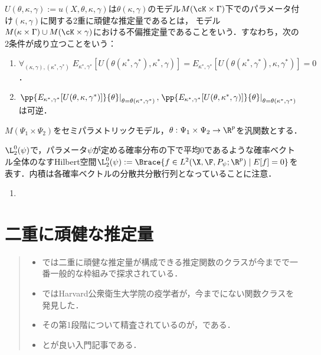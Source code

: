 \documentclass[uplatex,dvipdfmx]{jsreport}
\begin{document}
\begin{definition}
    $U(\theta,\kappa,\gamma):=u(X,\theta,\kappa,\gamma)$は$\theta(\kappa,\gamma)$のモデル$M(\cK\times\Gamma)$下でのパラメータ付け$(\kappa,\gamma)$に関する2重に頑健な推定量であるとは，
    モデル$M(\kappa\times\Gamma)\cup M(\cK\times\gamma)$における不偏推定量であることをいう．すなわち，次の2条件が成り立つことをいう：
    \begin{enumerate}
        \item $\forall_{(\kappa,\gamma),(\kappa^*,\gamma^*)}\;E_{\kappa^*,\gamma^*}[U(\theta(\kappa^*,\gamma^*),\kappa^*,\gamma)]=E_{\kappa^*,\gamma^*}[U(\theta(\kappa^*,\gamma^*),\kappa,\gamma^*)]=0$．
        \item $\left.\pp{E_{\kappa^*,\gamma^*}[U(\theta,\kappa,\gamma^*)]}{\theta}\right|_{\theta=\theta(\kappa^*,\gamma^*)},\left.\pp{E_{\kappa^*,\gamma^*}[U(\theta,\kappa^*,\gamma)]}{\theta}\right|_{\theta=\theta(\kappa^*,\gamma^*)}$は可逆．
    \end{enumerate}
\end{definition}

\begin{notation}
    $M(\Psi_1\times\Psi_2)$をセミパラメトリックモデル，$\theta:\Psi_1\times\Psi_2\to\R^p$を汎関数とする．
\end{notation}

\begin{definition}
    $\L^0_2(\psi)$で，パラメータ$\psi$が定める確率分布の下で平均$0$であるような確率ベクトル全体のなすHilbert空間$\L^0_2(\psi):=\Brace{f\in L^2(\X,\F,P_\psi;\R^p)\mid E[f]=0}$を表す．内積は各確率ベクトルの分散共分散行列となっていることに注意．
    \begin{enumerate}
        \item 
    \end{enumerate}
\end{definition}

\chapter{二重に頑健な推定量}

\begin{quotation}
    \begin{itemize}
        \item \cite{Chernozhukov-Ichimura-Newey22-LocallyRobust}では二重に頑健な推定量が構成できる推定関数のクラスが今までで一番一般的な枠組みで探求されている．
        \item \cite{Rotnitzky-Smucler-Robins21-MixedBiasProperty}ではHarvard公衆衛生大学院の疫学者が，今までにない関数クラスを発見した．
        \item その第1段階について精査されているのが\cite{Chernozhukov-Newey-Robins18-Double/Debiased-Machine-Learning}，\cite{Chernozhukov-Newey-Singh22-DebiasedMachineLearning}である．
        \item \cite{Seaman18-DoubleRobustMethod}と\cite{Bickel-Kwon01-QandA}が良い入門記事である．
    \end{itemize}
\end{quotation}
\end{document}
